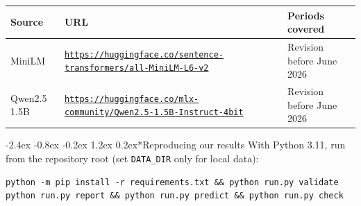\documentclass[11pt,a4paper]{article}
\makeatletter
\renewcommand\section{\@startsection{section}{1}{\z@}
  {-2.4ex \@plus -0.8ex \@minus -0.2ex}
  {1.2ex \@plus 0.2ex}{\normalfont\Large\bfseries}}
\makeatother
\begin{document}
\begingroup
\centering
\small
\begin{tabular}{p{3.0cm}p{7.3cm}p{3.3cm}}
\toprule
Source & URL & Periods covered \\
\midrule
MiniLM &
\href{https://huggingface.co/sentence-transformers/all-MiniLM-L6-v2/tree/c9745ed1d9f207416be6d2e6f8de32d1f16199bf}{\nolinkurl{https://huggingface.co/sentence-transformers/all-MiniLM-L6-v2}} &
Revision before June 2026 \\
Qwen2.5 1.5B &
\href{https://huggingface.co/mlx-community/Qwen2.5-1.5B-Instruct-4bit/tree/8b403126fc14f14cfc99bb4cfa72ecbc129ea677}{\nolinkurl{https://huggingface.co/mlx-community/Qwen2.5-1.5B-Instruct-4bit}} &
Revision before June 2026 \\
\bottomrule
\end{tabular}
\par
\endgroup

\section*{Reproducing our results}
With Python 3.11, run from the repository root (set \verb|DATA_DIR| only for local data):
\begin{verbatim}
python -m pip install -r requirements.txt && python run.py validate
python run.py report && python run.py predict && python run.py check
\end{verbatim}
\end{document}
